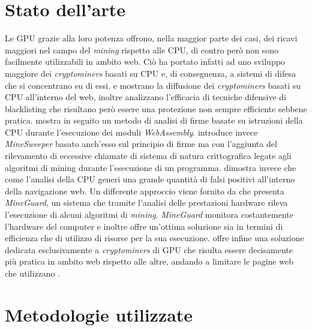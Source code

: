\documentclass[conference, italian]{IEEEtran}
\newcommand\citen[1]{\citeauthor{#1} \citep{#1}}
\newcommand\citetitlen[1]{\citetitle{#1} \citep{#1}}
\begin{document}
\section{Stato dell'arte}\label{sec:related-work}
Le GPU grazie alla loro potenza offrono, nella maggior parte dei casi, dei ricavi maggiori nel campo del \emph{mining} rispetto alle CPU, di contro però non sono facilmente utilizzabili in ambito web. Ciò ha portato infatti ad uno sviluppo maggiore dei \emph{cryptominers} basati su CPU e, di conseguenza, a sistemi di difesa che si concentrano su di essi. \citen{musch2018web} e \citen{saad2018end} mostrano la diffusione dei \emph{cryptominers} basati su CPU all'interno del web, inoltre analizzano l'efficacia di tecniche difensive di blacklisting che risultano però essere una protezione non sempre efficiente sebbene pratica. \citen{wang2018seismic} mostra in seguito un metodo di analisi di firme basate su istruzioni della CPU durante l'esecuzione dei moduli \emph{WebAssembly}. \citen{konoth2018minesweeper} introduce invece \emph{MineSweeper} basato anch'esso sul principio di firme ma con l'aggiunta del rilevamento di eccessive chiamate di sistema di natura crittografica legate agli algoritmi di mining durante l'esecuzione di un programma. \citen{kharraz2019outguard} dimostra invece che come l'analisi della CPU generi una grande quantità di falsi positivi all'interno della navigazione web. Un differente approccio viene fornito da \citen{tahir2017mining} che presenta \emph{MineGuard}, un sistema che tramite l'analisi delle prestazioni hardware rileva l'esecuzione di alcuni algoritmi di \emph{mining}. \emph{MineGuard} monitora costantemente l'hardware del computer e inoltre offre un'ottima soluzione sia in termini di efficienza che di utilizzo di risorse per la sua esecuzione. \citen{belkin2019risks} offre infine una soluzione dedicata esclusivamente a \emph{cryptominers} di GPU che risulta essere decisamente più pratica in ambito web rispetto alle altre, andando a limitare le pagine web che utilizzano \citetitlen{WebGL}.

\section{Metodologie utilizzate}\label{sec:methodologies}
\end{document}
